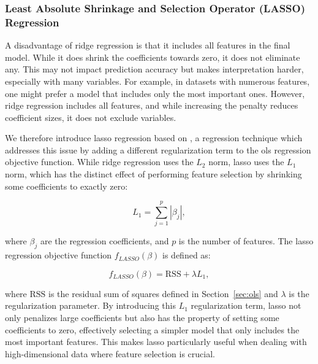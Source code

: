 \subsubsection{Least Absolute Shrinkage and Selection Operator (LASSO) Regression}
A disadvantage of ridge regression is that it includes all features in the final model.
While it does shrink the coefficients towards zero, it does not eliminate any.
This may not impact prediction accuracy but makes interpretation harder, especially with many variables.
For example, in datasets with numerous features, one might prefer a model that includes only the most important ones.
However, ridge regression includes all features, and while increasing the penalty reduces coefficient sizes, it does not exclude variables\cite{James2023AnIS}.

We therefore introduce \gls{lasso} regression based on \citet{James2023AnIS}, a regression technique which addresses this issue by adding a different regularization term to the \gls{ols} regression objective function.
While ridge regression uses the $L_2$ norm, \gls{lasso} uses the $L_1$ norm, which has the distinct effect of performing feature selection by shrinking some coefficients to exactly zero:

$$
L_1 = \sum_{j=1}^{p} |\beta_j|,
$$

where $\beta_j$ are the regression coefficients, and $p$ is the number of features.
The \gls{lasso} regression objective function $f_{LASSO}(\beta)$ is defined as:

$$
f_{LASSO}(\beta) = \text{RSS} + \lambda L_1,
$$

where $\text{RSS}$ is the residual sum of squares defined in Section~\ref{sec:ols} and $\lambda$ is the regularization parameter.
By introducing this $L_1$ regularization term, \gls{lasso} not only penalizes large coefficients but also has the property of setting some coefficients to zero, effectively selecting a simpler model that only includes the most important features.
This makes \gls{lasso} particularly useful when dealing with high-dimensional data where feature selection is crucial.